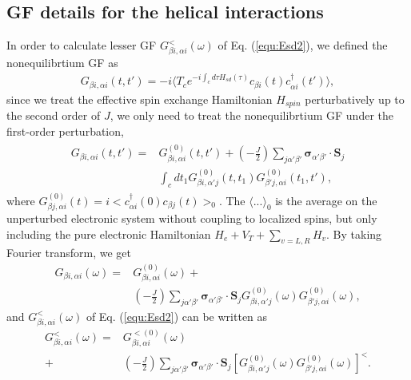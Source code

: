 \documentclass[aps,prb,twocolumn,showpacs,amssymb]{revtex4-1}
\begin{document}
\begin{appendix}
\section{GF details for the helical interactions}\label{appendixA}
In order to calculate lesser GF $G^{<}_{{\beta}i,{\alpha}i}(\omega)$ of Eq. (\ref{equ:Esd2}), we defined the nonequilibrtium GF as
\begin{eqnarray}\label{aequ:}
G_{{\beta}i,{\alpha}i}(t,t')=-i{\langle}T_ce^{-i{\int}_cd{\tau}H_{sd}({\tau})}c_{{\beta}i}(t)c_{{\alpha}i}^{\dagger}(t')\rangle,
\end{eqnarray}
since we treat the effective spin exchange Hamiltonian $H_{spin}$ perturbatively up to the second order of $J$, we only need to treat the nonequilibrtium GF under the first-order perturbation,
\begin{eqnarray}\label{aequ:}
\begin{aligned}
G_{{\beta}i,{\alpha}i}(t,t')=&G^{(0)}_{{\beta}i,{\alpha}i}(t,t')+(-\frac{J}{2})\sum\limits_{j\alpha'\beta'}\bm{\sigma}_{\alpha'\beta'}\cdot\bm{S}_{j}\\
&{\int}_cd{t_1}G^{(0)}_{{\beta}i,{\alpha'}j}(t,t_1)G^{(0)}_{{\beta'}j,{\alpha}i}(t_1,t'),
\end{aligned}
\end{eqnarray}
where $G_{{\beta}j,{\alpha}i}^{(0)}(t)=i<c_{{\alpha}i}^{\dagger}(0)c_{{\beta}j}(t)>_0$.
The $\langle ... \rangle_0$ is the average on the unperturbed electronic system without coupling to localized spins, but only including the pure electronic Hamiltonian $H_e+V_T+\sum_{v=L,R}H_v$.
By taking Fourier transform, we get
\begin{equation}\label{aequ:}
\begin{aligned}
G_{{\beta}i,{\alpha}i}(\omega)=&G_{{\beta}i,{\alpha}i}^{(0)}(\omega)+\\
&(-\frac{J}{2})\sum\limits_{j\alpha'\beta'}\bm{\sigma}_{\alpha'\beta'}\cdot\bm{S}_{j}
G_{{\beta}i,{\alpha'}j}^{(0)}(\omega)G_{{\beta'}j,{\alpha}i}^{(0)}(\omega),
\end{aligned}
\end{equation}
and $G^{<}_{{\beta}i,{\alpha}i}(\omega)$ of Eq. (\ref{equ:Esd2}) can be written as
\begin{equation}\label{aequ:Gw}
\begin{aligned}
G^{<}_{{\beta}i,{\alpha}i}(\omega)=&G_{{\beta}i,{\alpha}i}^{<(0)}(\omega)\\
+&(-\frac{J}{2})\sum\limits_{j\alpha'\beta'}\bm{\sigma}_{\alpha'\beta'}\cdot\bm{S}_{j}
[G_{{\beta}i,{\alpha'}j}^{(0)}(\omega)G_{{\beta'}j,{\alpha}i}^{(0)}(\omega)]^{<}.
\end{aligned}
\end{equation}


\end{appendix}
\end{document}
